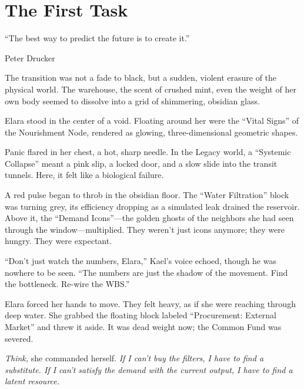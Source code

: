 
\chapter{The First Task}
\epigraph{``The best way to predict the future is to create it.''}{Peter Drucker}

The transition was not a fade to black, but a sudden, violent erasure of the physical world. The warehouse, the scent of crushed mint, even the weight of her own body seemed to dissolve into a grid of shimmering, obsidian glass. 

Elara stood in the center of a void. Floating around her were the ``Vital Signs'' of the Nourishment Node, rendered as glowing, three-dimensional geometric shapes. 


Panic flared in her chest, a hot, sharp needle. In the Legacy world, a ``Systemic Collapse'' meant a pink slip, a locked door, and a slow slide into the transit tunnels. Here, it felt like a biological failure. 

A red pulse began to throb in the obsidian floor. The ``Water Filtration'' block was turning grey, its efficiency dropping as a simulated leak drained the reservoir. Above it, the ``Demand Icons''—the golden ghosts of the neighbors she had seen through the window—multiplied. They weren't just icons anymore; they were hungry. They were expectant. 

``Don't just watch the numbers, Elara,'' Kael's voice echoed, though he was nowhere to be seen. ``The numbers are just the shadow of the movement. Find the bottleneck. Re-wire the WBS.''

Elara forced her hands to move. They felt heavy, as if she were reaching through deep water. She grabbed the floating block labeled ``Procurement: External Market'' and threw it aside. It was dead weight now; the Common Fund was severed. 



\textit{Think,} she commanded herself. \textit{If I can't buy the filters, I have to find a substitute. If I can't satisfy the demand with the current output, I have to find a latent resource.}

